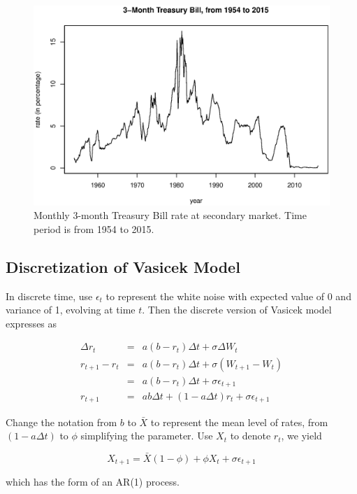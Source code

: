 \documentclass[11pt,reqno,final]{amsart}
\begin{document}
\begin{figure}
  \centering
  \includegraphics[scale=0.7]{plot_rates.eps}
  \caption{Monthly 3-month Treasury Bill rate at secondary market. Time period is from 1954 to 2015.}\label{plot_rates}
\end{figure}


\subsection{Discretization of Vasicek Model}
In discrete time, use $\epsilon_t$ to represent the white noise with expected value of 0 and variance of 1, evolving at time $t$. Then the discrete version of Vasicek model expresses as

\begin{eqnarray*}
\Delta r_t    &=& a(b-r_t) \Delta t + \sigma \Delta W_t \\
r_{t+1} - r_t &=& a(b - r_t) \Delta t + \sigma (W_{t+1} - W_t) \\
              &=& a(b - r_t) \Delta t + \sigma \epsilon_{t+1} \\
r_{t+1}       &=& ab\Delta t + (1 - a\Delta t) r_t + \sigma \epsilon_{t+1}
\end{eqnarray*}

Change the notation from $b$ to $\bar{X}$ to represent the mean level of rates,
from $(1-a\Delta t)$ to $\phi$ simplifying the parameter. Use $X_t$ to denote $r_t$, we yield

\begin{equation} \label{discrete_ar1}
X_{t+1} = \bar{X} (1-\phi) + \phi X_t + \sigma \epsilon_{t+1}
\end{equation}

which has the form of an AR(1) process.
\end{document}
